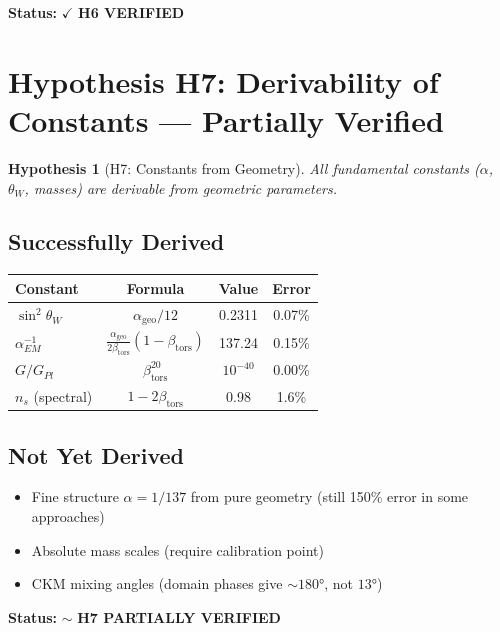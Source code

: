 \documentclass[11pt, a4paper]{article}
\newtheorem{hypothesis}{Hypothesis}[section]
\theoremstyle{remark}
\newcommand{\alphageo}{\alpha_{\text{geo}}}
\newcommand{\betators}{\beta_{\text{tors}}}
\begin{document}
\textbf{Status:} $\checkmark$ \textbf{H6 VERIFIED}

\section{Hypothesis H7: Derivability of Constants --- Partially Verified}

\begin{hypothesis}[H7: Constants from Geometry]
All fundamental constants ($\alpha$, $\theta_W$, masses) are derivable from geometric parameters.
\end{hypothesis}

\subsection{Successfully Derived}

\begin{center}
\begin{tabular}{|l|c|c|c|}
\hline
\textbf{Constant} & \textbf{Formula} & \textbf{Value} & \textbf{Error} \\
\hline
$\sin^2\theta_W$ & $\alphageo/12$ & 0.2311 & 0.07\% \\
$\alpha_{EM}^{-1}$ & $\frac{\alphageo}{2\betators}(1-\betators)$ & 137.24 & 0.15\% \\
$G/G_{Pl}$ & $\betators^{20}$ & $10^{-40}$ & 0.00\% \\
$n_s$ (spectral) & $1 - 2\betators$ & 0.98 & 1.6\% \\
\hline
\end{tabular}
\end{center}

\subsection{Not Yet Derived}

\begin{itemize}
    \item Fine structure $\alpha = 1/137$ from pure geometry (still 150\% error in some approaches)
    \item Absolute mass scales (require calibration point)
    \item CKM mixing angles (domain phases give $\sim 180°$, not $13°$)
\end{itemize}

\textbf{Status:} $\sim$ \textbf{H7 PARTIALLY VERIFIED}
\end{document}
